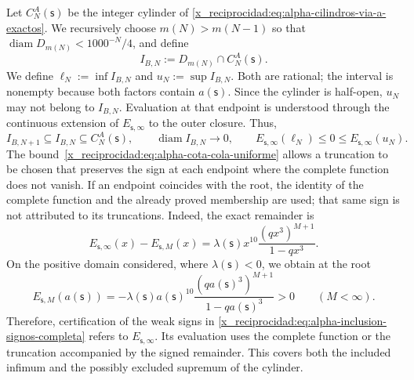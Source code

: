 Let \(C_N^A(\mathsf s)\) be the integer cylinder of
\eqref{x_reciprocidad:eq:alpha-cilindros-via-a-exactos}. We recursively choose
\(m(N)>m(N-1)\) so that
\(\operatorname{diam}D_{m(N)}<1000^{-N}/4\), and define
\begin{equation}
I_{B,N}:=D_{m(N)}\cap C_N^A(\mathsf s).
 \label{x_reciprocidad:eq:alpha-intervalos-b-completos}
\end{equation}
We define
\(\ell_N:=\inf I_{B,N}\) and \(u_N:=\sup I_{B,N}\). Both are rational;
the interval is nonempty because both factors contain
\(a(\mathsf s)\). Since the cylinder is half-open, \(u_N\) may not
belong to \(I_{B,N}\). Evaluation at that endpoint is understood through
the continuous extension of \(E_{\mathsf s,\infty}\) to the outer closure. Thus,
\begin{equation}
 I_{B,N+1}\subseteq I_{B,N}\subseteq C_N^A(\mathsf s),
 \qquad \operatorname{diam}I_{B,N}\longrightarrow0,
 \qquad E_{\mathsf s,\infty}(\ell_N)\leq0\leq
 E_{\mathsf s,\infty}(u_N).
 \label{x_reciprocidad:eq:alpha-inclusion-signos-completa}
\end{equation}
The bound~\eqref{x_reciprocidad:eq:alpha-cota-cola-uniforme} allows a
truncation to be chosen that preserves the sign at each endpoint where the complete function
does not vanish. If an endpoint coincides with the root, the identity of
the complete function and the already proved membership are used; that same
sign is not attributed to its truncations. Indeed, the exact remainder is
\[
 E_{\mathsf s,\infty}(x)-E_{\mathsf s,M}(x)
 =\lambda(\mathsf s)x^{10}
   \frac{(qx^3)^{M+1}}{1-qx^3}.
\]
On the positive domain considered, where \(\lambda(\mathsf s)<0\), we
obtain at the root
\[
 E_{\mathsf s,M}(a(\mathsf s))
 =-\lambda(\mathsf s)a(\mathsf s)^{10}
   \frac{(qa(\mathsf s)^3)^{M+1}}{1-qa(\mathsf s)^3}>0
 \qquad(M<\infty).
\]
Therefore, certification of the weak signs in
\eqref{x_reciprocidad:eq:alpha-inclusion-signos-completa} refers to
\(E_{\mathsf s,\infty}\). Its evaluation uses the complete function or the
truncation accompanied by the signed remainder. This covers both the included infimum
and the possibly excluded supremum of the cylinder.

